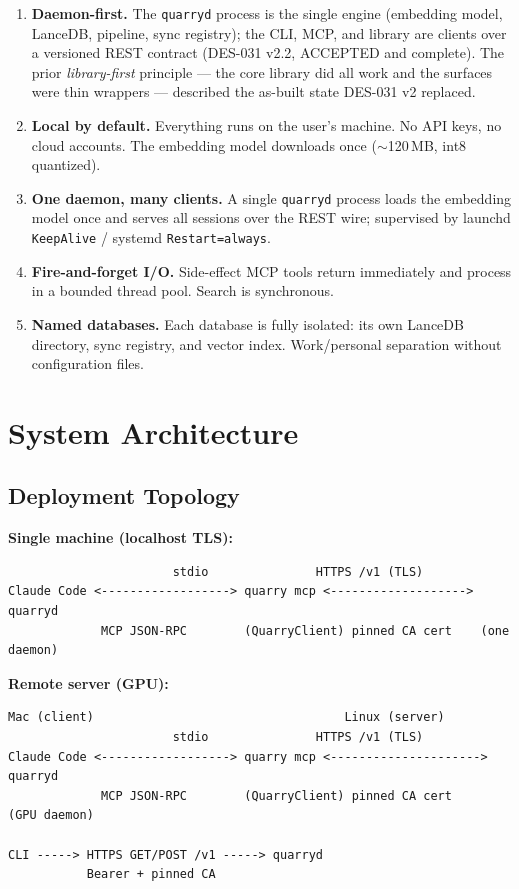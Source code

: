 \documentclass[a4paper,10pt]{article}
\begin{document}
\begin{enumerate}[label=\textbf{P\arabic*}.]
  \item \textbf{Daemon-first.}  The \texttt{quarryd} process is
    the single engine (embedding model, LanceDB, pipeline, sync
    registry); the CLI, MCP, and library are clients over a
    versioned REST contract (DES-031 v2.2, ACCEPTED and complete).
    The prior \emph{library-first} principle --- the core library did
    all work and the surfaces were thin wrappers --- described the
    as-built state DES-031 v2 replaced.
  \item \textbf{Local by default.}  Everything runs on the user's
    machine.  No API keys, no cloud accounts.  The embedding model
    downloads once ($\sim$120\,MB, int8 quantized).
  \item \textbf{One daemon, many clients.}  A single
    \texttt{quarryd} process loads the embedding model once and
    serves all sessions over the REST wire; supervised by launchd
    \texttt{KeepAlive} / systemd \texttt{Restart=always}.
  \item \textbf{Fire-and-forget I/O.}  Side-effect MCP tools return
    immediately and process in a bounded thread pool.  Search is
    synchronous.
  \item \textbf{Named databases.}  Each database is fully isolated:
    its own LanceDB directory, sync registry, and vector index.
    Work/personal separation without configuration files.
\end{enumerate}

\section{System Architecture}

\subsection{Deployment Topology}

\textbf{Single machine (localhost TLS):}
\begin{lstlisting}
                       stdio               HTTPS /v1 (TLS)
Claude Code <------------------> quarry mcp <-------------------> quarryd
             MCP JSON-RPC        (QuarryClient) pinned CA cert    (one daemon)
\end{lstlisting}

\textbf{Remote server (GPU):}
\begin{lstlisting}
Mac (client)                                   Linux (server)
                       stdio               HTTPS /v1 (TLS)
Claude Code <------------------> quarry mcp <---------------------> quarryd
             MCP JSON-RPC        (QuarryClient) pinned CA cert     (GPU daemon)

CLI -----> HTTPS GET/POST /v1 -----> quarryd
           Bearer + pinned CA
\end{lstlisting}
\end{document}
